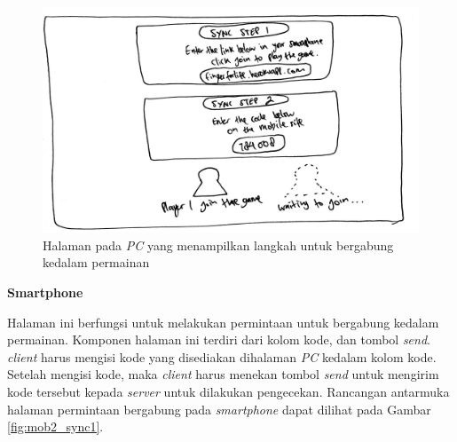 \begin{enumerate}
\begin{figure}[H]
	\centering
	\includegraphics[scale=0.1]{Gambar/web2_sync}
	\caption{Halaman pada \textit{PC} yang menampilkan langkah untuk bergabung kedalam permainan}
	\label{fig:web2_sync}
\end{figure}

	\textbf{Smartphone}
	
	Halaman ini berfungsi untuk melakukan permintaan untuk bergabung kedalam permainan. Komponen halaman ini terdiri dari kolom kode, dan tombol \textit{send}. \textit{client} harus mengisi kode yang disediakan dihalaman \textit{PC} kedalam kolom kode. Setelah mengisi kode, maka \textit{client} harus menekan tombol \textit{send} untuk mengirim kode tersebut kepada \textit{server} untuk dilakukan pengecekan. Rancangan antarmuka halaman permintaan bergabung pada \textit{smartphone} dapat dilihat pada Gambar \ref{fig:mob2_sync1}.
	

\end{enumerate}
